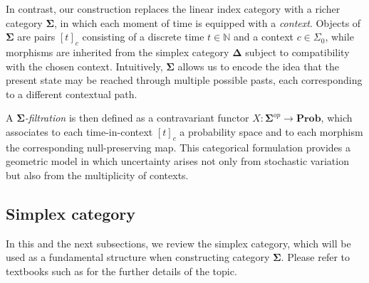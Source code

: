 \documentclass[12pt, a4paper]{amsart}
\theoremstyle{plain}
\theoremstyle{definition}
\numberwithin{figure}{section}
\numberwithin{table}{section}
\numberwithin{equation}{section}
\newcommand{\Prob}{\mathbf{Prob}}
\newcommand{\bDelta}{\mathbf{\Delta}}
\newcommand{\bSigma}{\mathbf{\Sigma}}
\begin{document}
In contrast, 
our construction replaces the linear index category with a richer category $\bSigma$, 
in which each moment of time is equipped with a \emph{context}. 
Objects of $\bSigma$ are pairs $[t]_c$ consisting of a discrete time 
$t \in \mathbb{N}$ 
and a context 
$c \in \Sigma_0$, 
while morphisms are inherited from the simplex category $\bDelta$ 
subject to compatibility with the chosen context. 
Intuitively, $\bSigma$ allows us to encode the idea 
that the present state may be reached through multiple possible pasts, 
each corresponding to a different contextual path.

A \emph{$\bSigma$-filtration} is then defined as a contravariant functor
$
X : \bSigma^{op} \to \Prob
$,
which associates to each time-in-context $[t]_c$ a probability space and 
to each morphism the corresponding null-preserving map. 
This categorical formulation provides a geometric model 
in which uncertainty arises not only from stochastic variation but also from the multiplicity of contexts.



\subsection{Simplex category}
\label{simpCat}
\nocite{JT_2008}

In this and the next subsections, 
we review the simplex category,
which will be used as a fundamental structure when constructing 
category
$\bSigma$.
Please refer to textbooks such as
\cite{richter2020}
for the further details of the topic.
\end{document}
